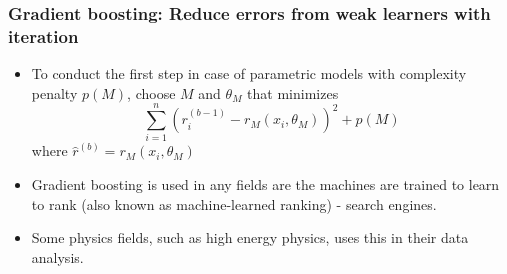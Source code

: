 \documentclass[aspectratio=169]{beamer}
\begin{document}
\begin{frame}
\frametitle{Gradient boosting: Reduce errors from weak learners with iteration}
\begin{itemize}
\item To conduct the first step in case of parametric models with complexity penalty $p(M)$, choose $M$ and $\theta_M$ that minimizes
\[
\sum_{i=1}^n (r_i^{(b-1)}-r_M(x_i,\theta_M))^2+p(M)
\]
where $\hat{r}^{(b)}=r_M(x_i,\theta_M)$\par
\item  Gradient boosting is used in any fields are the machines are trained to learn to rank (also known as machine-learned ranking) - search engines.
\item  Some physics fields, such as high energy physics, uses this in their data analysis. 

\end{itemize}
\end{frame}


\end{document}
